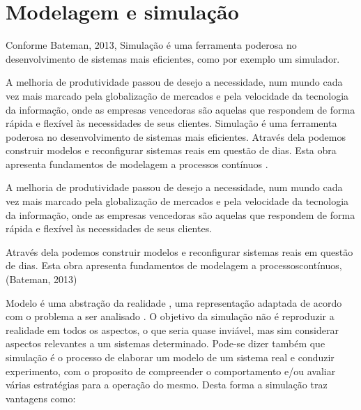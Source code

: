 \documentclass[12pt]{article}
\begin{document}
\section{Modelagem e simulação}

Conforme Bateman, 2013, Simulação é uma ferramenta poderosa no 
desenvolvimento de sistemas mais eficientes, como por exemplo um simulador.

A melhoria de produtividade passou de desejo a necessidade, num mundo cada 
vez mais marcado pela globalização de mercados e pela velocidade da
tecnologia da informação, onde as empresas vencedoras são aquelas que
respondem de forma rápida e flexível às necessidades de seus clientes.
Simulação é uma ferramenta poderosa no desenvolvimento de sistemas mais
eficientes. Através dela podemos construir modelos e reconfigurar
sistemas reais em questão de dias. Esta obra apresenta fundamentos de
modelagem a processos contínuos \cite{Bateman:13}.

A melhoria de produtividade passou de desejo a necessidade, num mundo 
cada vez mais marcado pela globalização de mercados e pela velocidade
da tecnologia da informação, onde as empresas vencedoras são aquelas
que respondem de forma rápida e flexível às necessidades de seus clientes. 


Através dela podemos construir modelos e reconfigurar sistemas
reais em questão de dias. Esta obra apresenta fundamentos de modelagem 
a processoscontínuos, (Bateman, 2013)


Modelo é uma abstração da realidade , uma representação adaptada de acordo
com o problema a ser analisado . O objetivo da simulação não é reproduzir
a realidade em todos os aspectos, o que seria quase inviável, mas sim 
considerar aspectos relevantes a um sistemas determinado. Pode-se dizer
também que simulação é o processo de elaborar um modelo de um sistema
real e conduzir experimento, com o proposito de compreender o comportamento
e/ou avaliar várias estratégias para a operação do mesmo. Desta forma a
simulação traz vantagens como:
\end{document}
